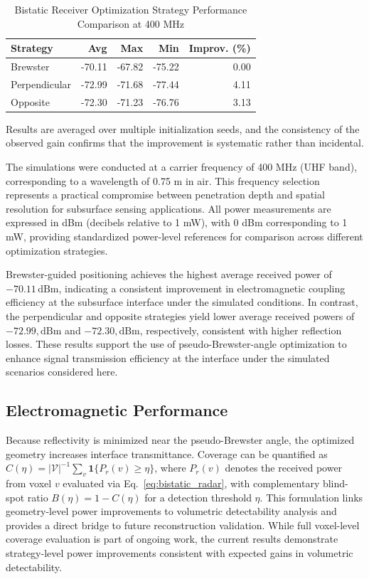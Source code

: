 \documentclass[conference]{IEEEtran}
\begin{document}
\begin{table}[hbt]
\centering
\caption{Bistatic Receiver Optimization Strategy Performance Comparison at 400 MHz}
\label{tab:optimization_results}
\setlength{\tabcolsep}{4pt} %
\small
\begin{tabular}{lrrrr}
\toprule
\textbf{Strategy} & \textbf{Avg} & \textbf{Max} & \textbf{Min} & \textbf{Improv. (\%)} \\
\midrule
Brewster & -70.11 & -67.82 & -75.22 & 0.00 \\
Perpendicular & -72.99 & -71.68 & -77.44 & 4.11 \\
Opposite & -72.30 & -71.23 & -76.76 & 3.13 \\
\bottomrule
\end{tabular}
\end{table}

Results are averaged over multiple initialization seeds, and the consistency of the observed gain confirms that the improvement is systematic rather than incidental.

The simulations were conducted at a carrier frequency of 400 MHz (UHF band), corresponding to a wavelength of 0.75 m in air. This frequency selection represents a practical compromise between penetration depth and spatial resolution for subsurface sensing applications. All power measurements are expressed in dBm (decibels relative to 1 mW), with 0 dBm corresponding to 1 mW, providing standardized power-level references for comparison across different optimization strategies.

Brewster-guided positioning achieves the highest average received power of $-70.11 \,\mathrm{dBm}$, indicating a consistent improvement in electromagnetic coupling efficiency at the subsurface interface under the simulated conditions. In contrast, the perpendicular and opposite strategies yield lower average received powers of $-72.99, \mathrm{dBm}$ and $-72.30, \mathrm{dBm}$, respectively, consistent with higher reflection losses. These results support the use of pseudo-Brewster-angle optimization to enhance signal transmission efficiency at the interface under the simulated scenarios considered here.

\subsection{Electromagnetic Performance}

Because reflectivity is minimized near the pseudo-Brewster angle, the optimized geometry increases interface transmittance. Coverage can be quantified as $C(\eta)=|\mathcal{V}|^{-1}\sum_v\mathbf{1}\{P_r(v)\ge\eta\}$, where $P_r(v)$ denotes the received power from voxel $v$ evaluated via Eq.~\ref{eq:bistatic_radar}, with complementary blind-spot ratio $B(\eta)=1-C(\eta)$ for a detection threshold $\eta$. This formulation links geometry-level power improvements to volumetric detectability analysis and provides a direct bridge to future reconstruction validation. While full voxel-level coverage evaluation is part of ongoing work, the current results demonstrate strategy-level power improvements consistent with expected gains in volumetric detectability.
\end{document}
